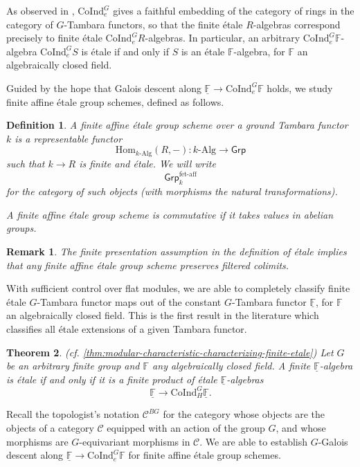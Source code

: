 \documentclass[11pt,dvipsnames]{amsart}
\newcommand{\F}{\mathbb{F}}
\newtheorem{letterthm}{Theorem}
\theoremstyle{BoldRemark}
\newtheorem{remark}[theorem]{Remark}
\newtheorem{letterdef}[letterthm]{Definition}
\newcommand{\Coind}{\mathrm{CoInd}}
\newcommand{\Hom}{\mathrm{Hom}}
\newcommand{\fet}{\mathsf{Grp}^{\mathrm{f\acute{e}t\text{-}aff}}}
\newcommand{\Alg}{\mathrm{Alg}}
\begin{document}
As observed in \cite{SSW24}, $\Coind_e^G$ gives a faithful embedding of the category of rings in the category of $G$-Tambara functors, so that the finite \'{e}tale $R$-algebras correspond precisely to finite \'{e}tale $\Coind_e^G R$-algebras. In particular, an arbitrary $\Coind_e^G \F$-algebra $\Coind_e^G S$ is \'{e}tale if and only if $S$ is an \'{e}tale $\F$-algebra, for $\F$ an algebraically closed field.

Guided by the hope that Galois descent along $\underline{\F} \rightarrow \Coind_e^G \F$ holds, we study finite affine \'{e}tale group schemes, defined as follows.

\begin{letterdef}
    A finite affine \'{e}tale group scheme over a ground Tambara functor $k$ is a representable functor 
    \[ 
        \Hom_{k\text{-}\Alg}(R,-) : k\text{-}\Alg \rightarrow \mathsf{Grp} 
    \] 
    such that $k \rightarrow R$ is finite and \'{e}tale. We will write 
    \[ 
        \fet_k 
    \] 
    for the category of such objects (with morphisms the natural transformations).

    A finite affine \'{e}tale group scheme is commutative if it takes values in abelian groups.
\end{letterdef}

\begin{remark}
    The finite presentation assumption in the definition of \'{e}tale implies that any finite affine \'{e}tale group scheme preserves filtered colimits.
\end{remark}

With sufficient control over flat modules, we are able to completely classify finite \'{e}tale $G$-Tambara functor maps out of the constant $G$-Tambara functor $\underline{\F}$, for $\F$ an algebraically closed field. This is the first result in the literature which classifies all \'{e}tale extensions of a given Tambara functor.

\begin{letterthm}(cf. \cref{thm:modular-characteristic-characterizing-finite-etale})
	Let $G$ be an arbitrary finite group and $\F$ any algebraically closed field. A finite $\underline{\F}$-algebra is \'{e}tale if and only if it is a finite product of \'{e}tale $\underline{\F}$-algebras 
    \[ 
    \underline{\F} \rightarrow \Coind_H^G \underline{\F} . 
    \]
\end{letterthm}

Recall the topologist's notation $\mathcal{C}^{BG}$ for the category whose objects are the objects of a category $\mathcal{C}$ equipped with an action of the group $G$, and whose morphisms are $G$-equivariant morphisms in $\mathcal{C}$. We are able to establish $G$-Galois descent along $\underline{\F} \rightarrow \Coind_e^G \F$ for finite affine \'{e}tale group schemes.
\end{document}
